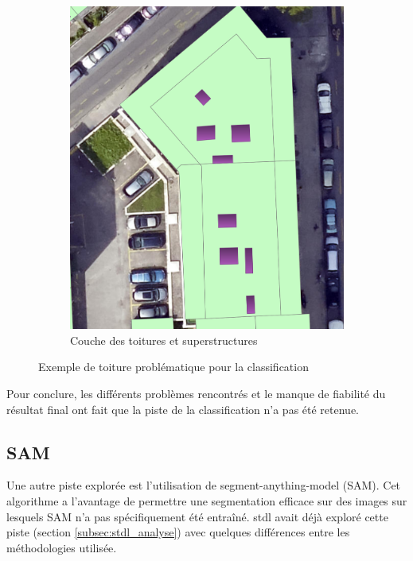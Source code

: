 \begin{figure}[H]
\begin{subfigure}[b]{0.475\textwidth}
        \includegraphics[width=\textwidth]{02-main/figures/ch3/ch3_piste_exploree_classification_09_resultats_image__toiture_sp.png}
        \caption{Couche des toitures et superstructures}
        \label{fig:ch3_piste_exploree_classification_09_resultats_image__toiture_sp}
    \end{subfigure}

    \caption{Exemple de toiture problématique pour la classification}
    \label{fig:piste_exploree_classification_resultats_explications}
\end{figure}

Pour conclure, les différents problèmes rencontrés et le manque de fiabilité du résultat final ont fait que la piste de la classification n'a pas été retenue.


\newpage
\subsection{SAM}
Une autre piste explorée est l'utilisation de segment-anything-model (SAM). Cet algorithme a l'avantage de permettre une segmentation efficace sur des images sur lesquels SAM n'a pas spécifiquement été entraîné. \acrshort{stdl} avait déjà exploré cette piste (section \ref{subsec:stdl_analyse}) avec quelques différences entre les méthodologies utilisée.

